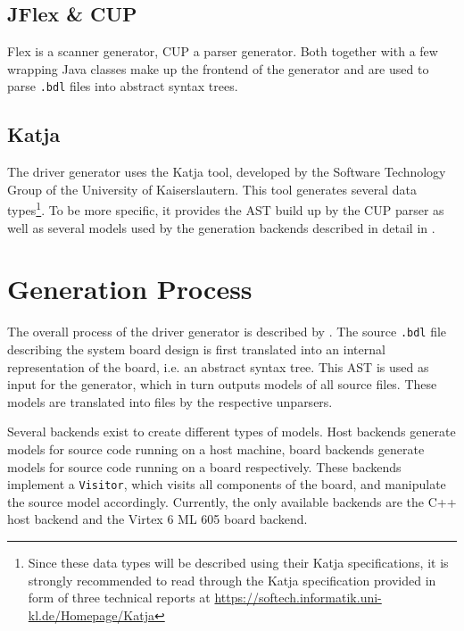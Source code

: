 \documentclass{report}
\begin{document}
\subsection{JFlex \& CUP}
Flex is a scanner generator, CUP a parser generator. Both together with a few wrapping Java classes make up the frontend of the generator and are used to parse \texttt{.bdl} files into abstract syntax trees.

\subsection{Katja}
The driver generator uses the Katja tool, developed by the Software Technology Group of the University of Kaiserslautern. This tool generates several data types\footnote{Since these data types will be described using their Katja specifications, it is strongly recommended to read through the Katja specification provided in form of three technical reports at \url{https://softech.informatik.uni-kl.de/Homepage/Katja}}. To be more specific, it provides the AST build up by the CUP parser as well as several models used by the generation backends described in detail in .

\section{Generation Process}
\label{sec:gen:process}
The overall process of the driver generator is described by . The source \texttt{.bdl} file describing the system board design is first translated into an internal representation of the board, i.e. an abstract syntax tree. This AST is used as input for the generator, which in turn outputs models of all source files. These models are translated into files by the respective unparsers.

Several backends exist to create different types of models. Host backends generate models for source code running on a host machine, board backends generate models for source code running on a board respectively. These backends implement a \texttt{Visitor}, which visits all components of the board, and manipulate the source model accordingly.
Currently, the only available backends are the C++ host backend and the Virtex 6 ML 605 board backend.
\end{document}
